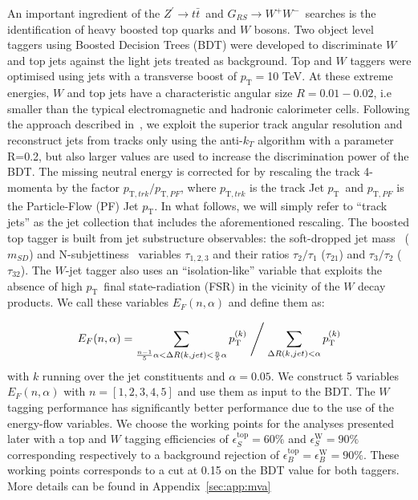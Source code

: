 \documentclass[a4paper,11pt]{article}
\newcommand*{\Zptt}{\ensuremath{Z^{\prime} \rightarrow \ttbar}}
\newcommand{\ptSub}[1]{\ensuremath{p_{\text{T} #1}}}
\newcommand{\ptSup}[1]{\ensuremath{p_{\text{T}}^{#1}}}
\newcommand{\pt}{\ensuremath{p_{\text{T}}}}
\newcommand{\mSD}{\ensuremath{m_{\ensuremath{SD}}}}
\newcommand*{\rsg}{\ensuremath{G_{RS} \rightarrow W^+W^-}}
\newcommand*{\ttbar}{\ensuremath{t\bar{t}}}
\begin{document}
An important ingredient of the \Zptt\ and \rsg\ searches is the identification of heavy boosted top quarks and $W$ bosons. Two object level taggers using Boosted Decision Trees (BDT) were developed to discriminate $W$ and top jets against the light jets treated as background.
Top and $W$ taggers were optimised using jets with a transverse boost of $\pt=$10 TeV. At these extreme energies, $W$ and top jets have a characteristic angular size $R=0.01-0.02$, i.e smaller than the typical electromagnetic and hadronic calorimeter cells. Following the approach described in~\cite{Larkoski:2015yqa}, we exploit the superior track angular resolution and reconstruct jets from tracks only using the anti-$k_T$ algorithm with a parameter R=0.2, but also larger values are used to increase the discrimination power of the BDT. The missing neutral energy is corrected for by rescaling the track 4-momenta by the factor $\ptSub{,trk}/\ptSub{,PF}$, where $\ptSub{,trk}$ is the track Jet \pt\ and $\ptSub{,PF}$ is the Particle-Flow (PF) Jet \pt. In what follows, we will simply refer to ``track jets'' as the jet collection that includes the aforementioned rescaling.
\newline
The boosted top tagger is built from jet substructure observables: the soft-dropped jet mass~\cite{Larkoski:2014wba} (\mSD) and N-subjettiness~\cite{Thaler:2010tr} variables $\tau_{1,2,3}$ and their ratios $\tau_{2}/\tau_{1}$ ($\tau_{21}$) and $\tau_{3}/\tau_{2}$ ($\tau_{32}$). The $W$-jet tagger also uses an ``isolation-like'' variable that exploits the absence of high \pt\ final state-radiation (FSR) in the vicinity of the $W$ decay products. We call these variables $E_{F}(n,\alpha)$ and define them as:


\begin{equation}
E_{F}(n,\alpha) =  \sum \limits_{\frac{n-1}{5}\alpha < \Delta R(k,jet)< \frac{n}{5}\alpha} \ptSup{(k)} \Biggm/ \sum \limits_{\Delta R(k,jet)< \alpha} \ptSup{(k)}
\end{equation}
with $k$ running over the jet constituents and $\alpha=0.05$. We construct 5 variables $E_{F}(n,\alpha)$ with $n=[1,2,3,4,5]$ and use them as input to the BDT.
The $W$ tagging performance has significantly better performance due to the use of the energy-flow variables. We choose the working points for the analyses presented later with a top and $W$ tagging efficiencies of $\epsilon_S^{\text{top}}=60\%$ and $\epsilon_S^{\text{W}}=90\%$ corresponding respectively to a background rejection of $\epsilon_B^{\text{top}}=\epsilon_B^{\text{W}}=90\%$. These working points corresponds to a cut at 0.15 on the BDT value for both taggers. More details can be found in Appendix~\ref{sec:app:mva}
\end{document}

